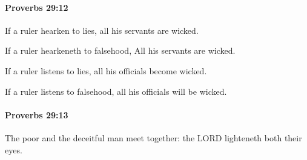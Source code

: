 		\paragraph{Proverbs 29:12} %
			\label{PROVERBS-29-12}

			If a ruler hearken to lies, all his servants are wicked.

			\begin{versebox}
					\item[BHS] 
					\item[ASV] If a ruler hearkeneth to falsehood, All his servants are wicked.
					\item[NIV] If a ruler listens to lies, all his officials become wicked.
					\item[NRSV] If a ruler listens to falsehood, all his officials will be wicked.
			\end{versebox}

		\paragraph{Proverbs 29:13} %
			\label{PROVERBS-29-13}

			The poor and the deceitful man meet together: the LORD lighteneth both their eyes.

